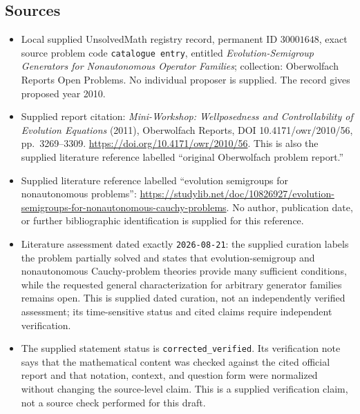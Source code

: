 \documentclass[11pt]{article}
\begin{document}
\subsection{Sources}
\begin{itemize}
\item Local supplied UnsolvedMath registry record, permanent ID \(30001648\), exact source problem code \texttt{catalogue entry}, entitled \emph{Evolution-Semigroup Generators for Nonautonomous Operator Families}; collection: Oberwolfach Reports Open Problems. No individual proposer is supplied. The record gives proposed year 2010.
\item Supplied report citation: \emph{Mini-Workshop: Wellposedness and Controllability of Evolution Equations} (2011), Oberwolfach Reports, DOI 10.4171/owr/2010/56, pp.\ 3269--3309. \url{https://doi.org/10.4171/owr/2010/56}. This is also the supplied literature reference labelled ``original Oberwolfach problem report.''
\item Supplied literature reference labelled ``evolution semigroups for nonautonomous problems'': \url{https://studylib.net/doc/10826927/evolution-semigroups-for-nonautonomous-cauchy-problems}. No author, publication date, or further bibliographic identification is supplied for this reference.
\item Literature assessment dated exactly \texttt{2026-08-21}: the supplied curation labels the problem partially solved and states that evolution-semigroup and nonautonomous Cauchy-problem theories provide many sufficient conditions, while the requested general characterization for arbitrary generator families remains open. This is supplied dated curation, not an independently verified assessment; its time-sensitive status and cited claims require independent verification.
\item The supplied statement status is \texttt{corrected\_verified}. Its verification note says that the mathematical content was checked against the cited official report and that notation, context, and question form were normalized without changing the source-level claim. This is a supplied verification claim, not a source check performed for this draft.
\end{itemize}
\end{document}
